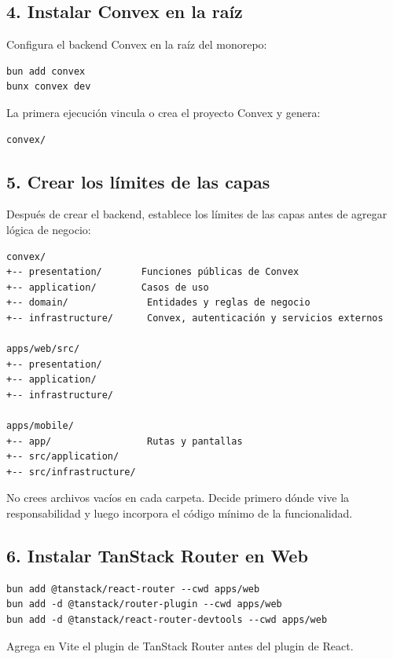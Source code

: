 \documentclass[11pt,a4paper]{article}
\begin{document}
\subsection{4. Instalar Convex en la raíz}

Configura el backend Convex en la raíz del monorepo:

\begin{lstlisting}
bun add convex
bunx convex dev
\end{lstlisting}

La primera ejecución vincula o crea el proyecto Convex y genera:

\begin{lstlisting}
convex/
\end{lstlisting}

\subsection{5. Crear los límites de las capas}

Después de crear el backend, establece los límites de las capas antes de
agregar lógica de negocio:

\begin{lstlisting}
convex/
+-- presentation/       Funciones públicas de Convex
+-- application/        Casos de uso
+-- domain/              Entidades y reglas de negocio
+-- infrastructure/      Convex, autenticación y servicios externos

apps/web/src/
+-- presentation/
+-- application/
+-- infrastructure/

apps/mobile/
+-- app/                 Rutas y pantallas
+-- src/application/
+-- src/infrastructure/
\end{lstlisting}

No crees archivos vacíos en cada carpeta. Decide primero dónde vive la
responsabilidad y luego incorpora el código mínimo de la funcionalidad.

\subsection{6. Instalar TanStack Router en Web}

\begin{lstlisting}
bun add @tanstack/react-router --cwd apps/web
bun add -d @tanstack/router-plugin --cwd apps/web
bun add -d @tanstack/react-router-devtools --cwd apps/web
\end{lstlisting}

Agrega en Vite el plugin de TanStack Router antes del plugin de React.
\end{document}
